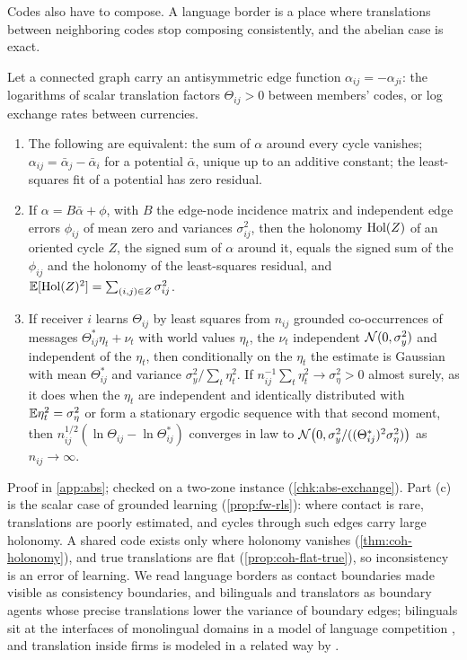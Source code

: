 Codes also have to compose. A language border is a place where translations between neighboring codes stop composing consistently, and the abelian case is exact.

\begin{proposition}\label{prop:abs-exchange-consistency}
Let a connected graph carry an antisymmetric edge function $\alpha_{ij}=-\alpha_{ji}$: the logarithms of scalar translation factors $\Theta_{ij}>0$ between members' codes, or log exchange rates between currencies.
\begin{enumerate}
\item[(a)] The following are equivalent: the sum of $\alpha$ around every cycle vanishes; $\alpha_{ij}=\bar\alpha_j-\bar\alpha_i$ for a potential $\bar\alpha$, unique up to an additive constant; the least-squares fit of a potential has zero residual.
\item[(b)] If $\alpha=B\bar\alpha+\phi$, with $B$ the edge-node incidence matrix and independent edge errors $\phi_{ij}$ of mean zero and variances $\sigma^2_{ij}$, then the holonomy $\operatorname{Hol}(Z)$ of an oriented cycle $Z$, the signed sum of $\alpha$ around it, equals the signed sum of the $\phi_{ij}$ and the holonomy of the least-squares residual, and $\mathbb{E}[\operatorname{Hol}(Z)^2]=\sum_{(i,j)\in Z}\sigma^2_{ij}$.
\item[(c)] If receiver $i$ learns $\Theta_{ij}$ by least squares from $n_{ij}$ grounded co-occurrences of messages $\Theta^\ast_{ij}\eta_t+\nu_t$ with world values $\eta_t$, the $\nu_t$ independent $\mathcal{N}(0,\sigma_y^2)$ and independent of the $\eta_t$, then conditionally on the $\eta_t$ the estimate is Gaussian with mean $\Theta^\ast_{ij}$ and variance $\sigma_y^2/\sum_t\eta_t^2$. If $n_{ij}^{-1}\sum_t\eta_t^2\to\sigma_\eta^2>0$ almost surely, as it does when the $\eta_t$ are independent and identically distributed with $\mathbb{E}\eta_t^2=\sigma_\eta^2$ or form a stationary ergodic sequence with that second moment, then $n_{ij}^{1/2}(\ln\Theta_{ij}-\ln\Theta^\ast_{ij})$ converges in law to $\mathcal{N}\bigl(0,\sigma_y^2/((\Theta^\ast_{ij})^2\sigma_\eta^2)\bigr)$ as $n_{ij}\to\infty$.
\end{enumerate}
\end{proposition}

Proof in \cref{app:abs}; checked on a two-zone instance (\cref{chk:abs-exchange}). Part (c) is the scalar case of grounded learning (\cref{prop:fw-rls}): where contact is rare, translations are poorly estimated, and cycles through such edges carry large holonomy. A shared code exists only where holonomy vanishes (\cref{thm:coh-holonomy}), and true translations are flat (\cref{prop:coh-flat-true}), so inconsistency is an error of learning. We read language borders as contact boundaries made visible as consistency boundaries, and bilinguals and translators as boundary agents whose precise translations lower the variance of boundary edges; bilinguals sit at the interfaces of monolingual domains in a model of language competition \citep{castello2006ordering}, and translation inside firms is modeled in a related way by \citet{cremer2007language}.

